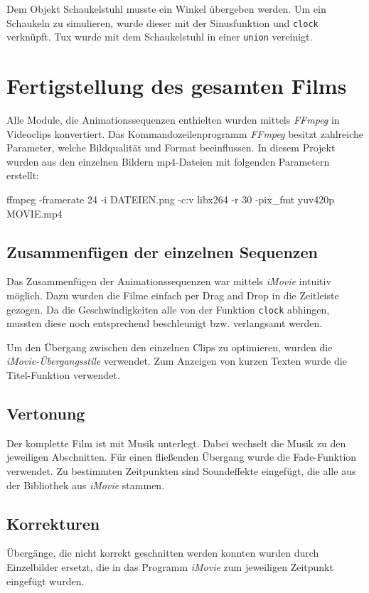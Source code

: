 \documentclass[11pt,parskip]{scrartcl}
\begin{document}
Dem Objekt Schaukelstuhl musste ein Winkel übergeben werden. Um ein Schaukeln
zu simulieren, wurde dieser mit der Sinusfunktion und \texttt{clock} verknüpft.
Tux wurde mit dem Schaukelstuhl in einer \texttt{union} vereinigt.


\newpage


\section{Fertigstellung des gesamten Films}
Alle Module, die Animationssequenzen enthielten wurden mittels \emph{FFmpeg} in
Videoclips konvertiert. Das Kommandozeilenprogramm \emph{FFmpeg} besitzt
zahlreiche Parameter, welche Bildqualität und Format beeinflussen. In diesem
Projekt wurden aus den einzelnen Bildern mp4-Dateien mit folgenden Parametern
erstellt:
%
\begin{tcblisting}{}
  ffmpeg -framerate 24 -i DATEIEN.png -c:v libx264 -r 30 -pix_fmt yuv420p
  MOVIE.mp4
\end{tcblisting}
%

\subsection{Zusammenfügen der einzelnen Sequenzen}
Das Zusammenfügen der Animationssequenzen war mittels \emph{iMovie} intuitiv
möglich. Dazu wurden die Filme einfach per Drag and Drop in die Zeitleiste
gezogen. Da die Geschwindigkeiten alle von der Funktion \texttt{clock}
abhingen, mussten diese noch entsprechend beschleunigt bzw. verlangsamt werden.

Um den Übergang zwischen den einzelnen Clips zu optimieren, wurden die
\emph{iMovie-Übergangsstile} verwendet. Zum Anzeigen von kurzen Texten wurde
die Titel-Funktion verwendet.


\subsection{Vertonung}
Der komplette Film ist mit Musik unterlegt. Dabei wechselt die Musik zu den
jeweiligen Abschnitten. Für einen fließenden Übergang wurde die Fade-Funktion
verwendet. Zu bestimmten Zeitpunkten sind Soundeffekte eingefügt, die alle aus
der Bibliothek aus \emph{iMovie} stammen.


\subsection{Korrekturen}
Übergänge, die nicht korrekt geschnitten werden konnten wurden durch
Einzelbilder ersetzt, die in das Programm \emph{iMovie} zum jeweiligen
Zeitpunkt eingefügt wurden.
\end{document}
